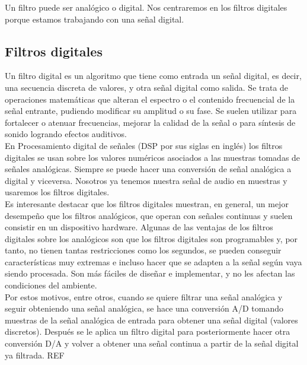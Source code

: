 Un filtro puede ser analógico o digital. Nos centraremos en los filtros digitales porque estamos trabajando con una señal digital. 

\subsection{Filtros digitales}

Un filtro digital es un algoritmo que tiene como entrada un señal digital, es decir, una secuencia discreta de valores, y otra señal digital como salida. Se trata de operaciones matemáticas que alteran el espectro o el contenido frecuencial de la señal entrante, pudiendo modificar su amplitud o su fase. Se suelen utilizar para fortalecer o atenuar frecuencias, mejorar la calidad de la señal o para síntesis de sonido logrando efectos auditivos. \\%

En Procesamiento digital de señales (DSP por sus siglas en inglés) los filtros digitales se usan sobre los valores numéricos asociados a las muestras tomadas de señales analógicas. Siempre se puede hacer una conversión de señal analógica a digital y viceversa. Nosotros ya tenemos nuestra señal de audio en muestras y usaremos los filtros digitales. \\

Es interesante destacar que los filtros digitales muestran, en general, un mejor desempeño que los filtros analógicos, que operan con señales continuas y suelen consistir en un dispositivo hardware. Algunas de las ventajas de los filtros digitales sobre los analógicos son que los filtros digitales son programables y, por tanto, no tienen tantas restricciones como los segundos, se pueden conseguir características muy extremas e incluso hacer que se adapten a la señal según vaya siendo procesada. Son más fáciles de diseñar e implementar, y no les afectan las condiciones del ambiente.\\

Por estos motivos, entre otros, cuando se quiere filtrar una señal analógica y seguir obteniendo una señal analógica, se hace una conversión A/D tomando muestras de la señal analógica de entrada para obtener una señal digital (valores discretos). Después se le aplica un filtro digital para posteriormente hacer otra conversión D/A y volver a obtener una señal continua a partir de la señal digital ya filtrada. REF \\

